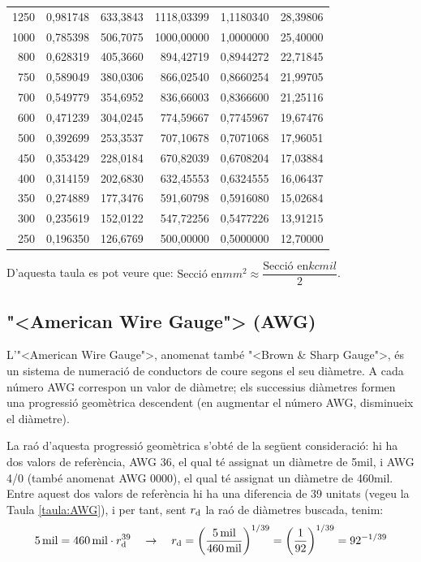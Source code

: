 \begin{longtable}{r<{\hspace{0.6em}}rrrrr}
1250 &   0,981748 &   633,3843 & 1118,03399 &  1,1180340 &   28,39806 \\
1000 &   0,785398 &   506,7075 & 1000,00000 &  1,0000000 &   25,40000 \\
 800 &   0,628319 &   405,3660 &  894,42719 &  0,8944272 &   22,71845 \\
 750 &   0,589049 &   380,0306 &  866,02540 &  0,8660254 &   21,99705 \\
 700 &   0,549779 &   354,6952 &  836,66003 &  0,8366600 &   21,25116 \\
 600 &   0,471239 &   304,0245 &  774,59667 &  0,7745967 &   19,67476 \\
 500 &   0,392699 &   253,3537 &  707,10678 &  0,7071068 &   17,96051 \\
 450 &   0,353429 &   228,0184 &  670,82039 &  0,6708204 &   17,03884 \\
 400 &   0,314159 &   202,6830 &  632,45553 &  0,6324555 &   16,06437 \\
 350 &   0,274889 &   177,3476 &  591,60798 &  0,5916080 &   15,02684 \\
 300 &   0,235619 &   152,0122 &  547,72256 &  0,5477226 &   13,91215 \\
 250 &   0,196350 &   126,6769 &  500,00000 &  0,5000000 &   12,70000 \\
\bottomrule[1pt]
\end{longtable}

D'aquesta taula es pot veure que: $\text{Secci\'{o} en}\unit{mm^2} \approx \dfrac{\text{Secci\'{o} en}\unit{kcmil}}{2}$.

\break
\subsection{{"<}American Wire Gauge{">} (AWG)}

L'{"<}American Wire Gauge{">}, anomenat tamb\'{e} {"<}Brown \& Sharp Gauge{">}, \'{e}s un sistema de numeraci\'{o} de conductors de coure segons el seu di\`{a}metre. A cada n\'{u}mero AWG correspon un valor de di\`{a}metre; els successius di\`{a}metres formen una progressi\'{o} geom\`{e}trica descendent (en augmentar el n\'{u}mero AWG, disminueix el di\`{a}metre).

La ra\'{o} d'aquesta progressi\'{o} geom\`{e}trica s'obt\'{e} de la seg\"{u}ent consideraci\'{o}: hi ha dos valors de refer\`{e}ncia, AWG 36, el qual t\'{e} assignat un di\`{a}metre de 5\unit{mil}, i AWG 4/0 (tamb\'{e} anomenat AWG 0000), el qual t\'{e} assignat un di\`{a}metre de 460\unit{mil}. Entre aquest dos valors de refer\`{e}ncia hi ha una diferencia de 39 unitats (vegeu la Taula \vref{taula:AWG}), i per tant, sent $r_\mathrm{d}$ la ra\'{o} de di\`{a}metres buscada, tenim:
\begin{equation}
   5\mathrm{\,mil} = 460\mathrm{\,mil} \cdot r_\mathrm{d}^{39} \quad \rightarrow \quad r_\mathrm{d} = \left( \frac{5\mathrm{\,mil}}{460\mathrm{\,mil}} \right)^{1/39} = \left( \frac{1}{92} \right)^{1/39} = 92^{-1/39}
\end{equation}

